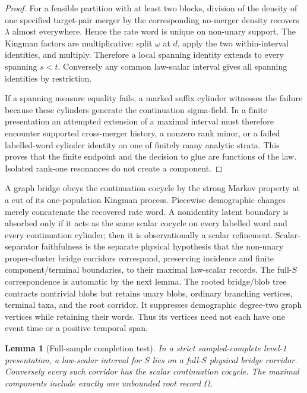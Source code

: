 \documentclass[11pt]{article}
\newtheorem{lemma}[theorem]{Lemma}
\begin{document}
\begin{proof}
For a feasible partition with at least two blocks, division of the density of one specified target-pair merger by the corresponding no-merger density recovers $\lambda$ almost everywhere.  Hence the rate word is unique on non-unary support.  The Kingman factors are multiplicative: split $\omega$ at $d$, apply the two within-interval identities, and multiply.  Therefore a local spanning identity extends to every spanning $s<t$.  Conversely any common law-scalar interval gives all spanning identities by restriction.

If a spanning measure equality fails, a marked suffix cylinder witnesses the failure because these cylinders generate the continuation sigma-field.  In a finite presentation an attempted extension of a maximal interval must therefore encounter supported cross-merger history, a nonzero rank minor, or a failed labelled-word cylinder identity on one of finitely many analytic strata.  This proves that the finite endpoint and the decision to glue are functions of the law.  Isolated rank-one resonances do not create a component.
\end{proof}

A graph bridge obeys the continuation cocycle by the strong Markov property at a cut of its one-population Kingman process.  Piecewise demographic changes merely concatenate the recovered rate word.  A nonidentity latent boundary is absorbed only if it acts as the same scalar cocycle on every labelled word and every continuation cylinder; then it is observationally a scalar refinement.  Scalar-separator faithfulness is the separate physical hypothesis that the non-unary proper-cluster bridge corridors correspond, preserving incidence and finite component/terminal boundaries, to their maximal law-scalar records.  The full-$S$ correspondence is automatic by the next lemma.  The rooted bridge/blob tree contracts nontrivial blobs but retains unary blobs, ordinary branching vertices, terminal taxa, and the root corridor.  It suppresses demographic degree-two graph vertices while retaining their words.  Thus its vertices need not each have one event time or a positive temporal span.

\begin{lemma}[Full-sample completion test]
\label{lem:supp-full-s-corridor}
In a strict sampled-complete level-1 presentation, a law-scalar interval for $S$ lies on a full-$S$ physical bridge corridor.  Conversely every such corridor has the scalar continuation cocycle.  The maximal components include exactly one unbounded root record $\Omega$.
\end{lemma}
\end{document}

